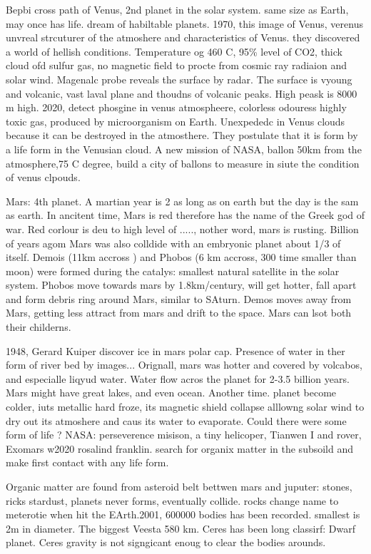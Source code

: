 {Bepbi cross path of Venus, 2nd planet in the solar system. same size as Earth, may once has life. dream of habiltable planets. 1970, this image of Venus, verenus unvreal strcuturer of the atmoshere and characteristics of  Venus. they discovered a world of hellish conditions. Temperature og 460 C, 95\% level of CO2, thick cloud ofd sulfur gas, no magnetic field to procte from cosmic ray radiaion and solar wind. Magenalc probe reveals the surface by radar. The surface is vyoung and volcanic, vast laval plane and thoudns of volcanic peaks. High peask is 8000 m high. 2020, detect phosgine in venus atmospheere, colorless odouress highly toxic gas, produced by microorganism on Earth. Unexpededc in Venus clouds because it can be destroyed in the atmosthere. They postulate that it is form by a life form in the Venusian cloud. A new mission of NASA, ballon 50km from the atmosphere,75 C degree, build a city of ballons to measure in siute the condition of venus clpouds.

Mars: 4th planet. A martian year is 2 as long as on earth but the day is the sam as earth. In ancitent time, Mars is red therefore has the name of the Greek god of war. Red corlour is deu to high level of ....., nother word, mars is rusting. Billion of years agom Mars was also colldide with an embryonic planet about 1/3 of itself. Demois (11km accross ) and Phobos (6 km accross, 300 time smaller than moon) were formed during the catalys: smallest natural satellite in the solar system. Phobos move towards mars by 1.8km/century, will get hotter, fall apart and form debris ring around Mars, similar to SAturn. Demos moves away from Mars, getting less attract from mars and drift to the space. Mars can lsot both their childerns.

1948, Gerard Kuiper discover ice in mars polar cap. Presence of water in ther form of river bed by images... Orignall, mars was hotter and covered by volcabos, and especialle liqyud water. Water flow acros the planet for 2-3.5 billion years. Mars might have great lakes, and even ocean.  Another time. planet become colder, iuts metallic hard froze, its magnetic shield collapse alllowng solar wind to dry out its atmoshere and caus its water to evaporate. Could there were some form of life ? 
NASA: perseverence misison, a tiny helicoper, Tianwen I and rover, Exomars w2020 rosalind franklin. search for organix matter in the subsoild and make first contact with any life form.

Organic matter are found from asteroid belt bettwen mars and juputer: stones, ricks stardust, planets never forms, eventually collide. rocks change name to meterotie when hit the EArth.2001, 600000 bodies has been recorded. smallest is 2m in diameter. The biggest Veesta 580 km. Ceres has been  long classirf: Dwarf planet. Ceres gravity is not signgicant enoug to clear the bodies arounds.

}
